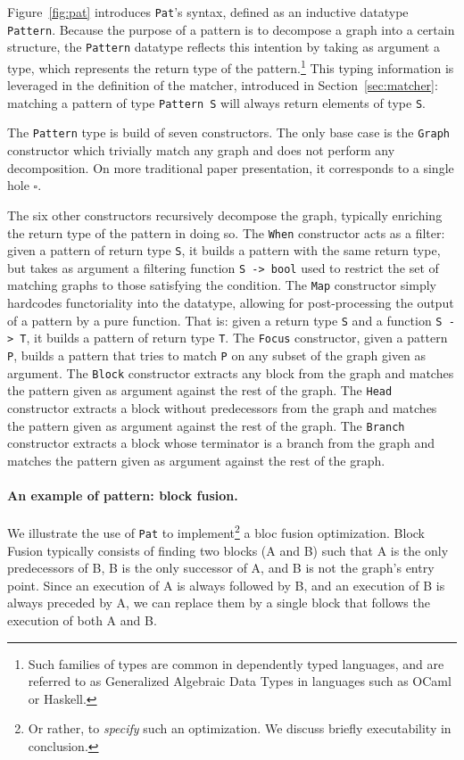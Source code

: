 \documentclass[11pt]{article}
\newcommand{\inlinecoq}[1]{\mbox{\lstinline[style=customcoq,columns=fixed,basewidth=.48em]{#1}}}
\newcommand{\ilc}[1]{\inlinecoq{#1}}
\newcommand{\pat}{\texttt{Pat}\xspace}
\begin{document}
Figure~\ref{fig:pat} introduces \pat{}'s syntax, defined as an inductive datatype \ilc{Pattern}.
Because the purpose of a pattern is to decompose a graph into a certain structure, the \ilc{Pattern} datatype reflects this intention by taking as argument a type, which represents the return type of the pattern.\footnote{Such families of types are common in dependently typed languages, and are referred to as Generalized Algebraic Data Types in languages such as OCaml or Haskell.}
This typing information is leveraged in the definition of the matcher, introduced in Section~\ref{sec:matcher}: matching a pattern of type \ilc{Pattern S} will always return elements of type \ilc{S}.

The \ilc{Pattern} type is build of seven constructors. The only base case is the \ilc{Graph} constructor which trivially match any graph and does not perform any decomposition. On more traditional paper presentation, it corresponds to a single hole $\square$.

The six other constructors recursively decompose the graph, typically enriching the return type of the pattern in doing so. 
The \ilc{When} constructor acts as a filter:
given a pattern of return type \ilc{S}, it builds a pattern with the same return type, but takes as argument a filtering function \ilc{S -> bool} used to restrict the set of matching graphs to those satisfying the condition.
The \ilc{Map} constructor simply hardcodes functoriality into the datatype, allowing for post-processing the output of a pattern by a pure function. That is: given a return type \ilc{S} and a function \ilc{S -> T}, it builds a pattern of return type \ilc{T}.
The \ilc{Focus} constructor, given a pattern \ilc{P}, builds a pattern that tries to match \ilc{P} on any subset of the graph given as argument.
The \ilc{Block} constructor extracts any block from the graph and matches the pattern given as argument against the rest of the graph.
The \ilc{Head} constructor extracts a block without predecessors from the graph and matches the pattern given as argument against the rest of the graph.
The \ilc{Branch} constructor extracts a block whose terminator is a branch from the graph and matches the pattern given as argument against the rest of the graph.

\paragraph*{An example of pattern: block fusion.}
We illustrate the use of \pat{} to implement\footnote{Or rather, to \emph{specify} such an optimization. We discuss briefly executability in conclusion.} a bloc fusion optimization.
Block Fusion typically consists of finding two blocks (A and B) such that A is the only predecessors of B, B is the only successor of A, and B is not the graph's entry point. Since an execution of A is always followed by B, and an execution of B is always preceded by A, we can replace them by a single block that follows the execution of both A and B.
\end{document}
